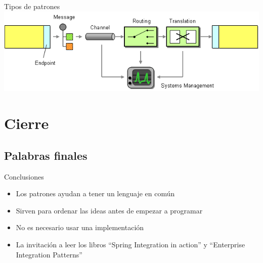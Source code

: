\documentclass{beamer}
\begin{document}
\begin{frame}{Tipos de patrones}
\includegraphics[width=0.9\linewidth]{tiposPatrones}
\end{frame}

\section{Cierre}
\subsection{Palabras finales}

\begin{frame}{Conclusiones}
\begin{itemize}[<+->]
\item Los patrones ayudan a tener un lenguaje en común
\item Sirven para ordenar las ideas antes de empezar a programar
\item No es necesario usar una implementación
\item La invitación a leer los libros ``Spring Integration in action'' y ``Enterprise Integration Patterns'' 
\end{itemize}
\end{frame}
\end{document}
